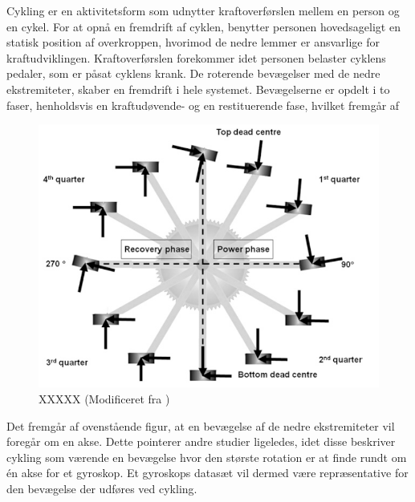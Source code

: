 Cykling er en aktivitetsform som udnytter kraftoverførslen mellem en person og en cykel. For at opnå en fremdrift af cyklen, benytter personen hovedsageligt en statisk position af overkroppen, hvorimod de nedre lemmer er ansvarlige for kraftudviklingen. \citep{Springer2014} \newline 
Kraftoverførslen forekommer idet personen belaster cyklens pedaler, som er påsat cyklens krank. De roterende bevægelser med de nedre ekstremiteter, skaber en fremdrift i hele systemet. Bevægelserne er opdelt i to faser, henholdsvis en kraftudøvende- og en restituerende fase, hvilket fremgår af 

\begin{figure}[H]
	\centering
	\includegraphics[scale=0.5]{figures/bProblemloesning/cykel_cyklus.png}
	\caption{XXXXX (Modificeret fra \citep{Springer2014})}
	\label{fig:cykel_cyklus}
\end{figure}

Det fremgår af ovenstående figur, at en bevægelse af de nedre ekstremiteter vil foregår om en akse. Dette pointerer andre studier ligeledes, idet disse beskriver cykling som værende en bevægelse hvor den største rotation er at finde rundt om én akse for et gyroskop. Et gyroskops datasæt vil dermed være repræsentative for den bevægelse der udføres ved cykling. \citep{Cockcroft2011,Marin-PerianuMarin-Perianu2013}
